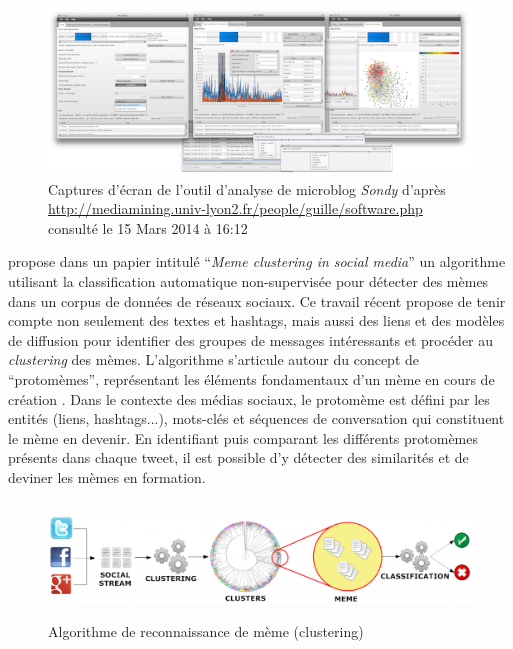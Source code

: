 \begin{figure}
    \includegraphics[scale=.7]{figures/chap3/sondy.png}
    \caption[Captures d'écran de l'outil d'analyse de microblog Sondy]{Captures d'écran de l'outil d'analyse de microblog \textit{Sondy} d'après \url{http://mediamining.univ-lyon2.fr/people/guille/software.php} consulté le 15 Mars 2014 à 16:12}
    \label{fig:sondy}
\end{figure}

\cite{Ferrara2013} propose dans un papier intitulé {\textquotedblleft}\textit{Meme clustering in social media}{\textquotedblright} un algorithme utilisant la classification automatique non-supervisée pour détecter des mèmes dans un corpus de données de réseaux sociaux. Ce travail récent propose de tenir compte non seulement des textes et hashtags, mais aussi des liens et des modèles de diffusion pour identifier des groupes de messages intéressants et procéder au \textit{clustering }des mèmes. L{\textquoteright}algorithme s{\textquoteright}articule autour du concept de {\textquotedblleft}protomèmes{\textquotedblright}, représentant les éléments fondamentaux d{\textquoteright}un mème en cours de création \citep{Gabora1995}. Dans le contexte des médias sociaux, le protomème est défini par les entités (liens, hashtags...), mots-clés et séquences de conversation qui constituent le mème en devenir. En identifiant puis comparant les différents protomèmes présents dans chaque tweet, il est possible d{\textquoteright}y détecter des similarités et de deviner les mèmes en formation.  

\begin{figure}[htbp]
    \centering
    \includegraphics[width=5.8894in,height=1.2114in]{figures/chap3/chapitre3-img6.png}
    \caption{Algorithme de reconnaissance de mème (clustering) \citep{Ferrara2013}}
\end{figure}

